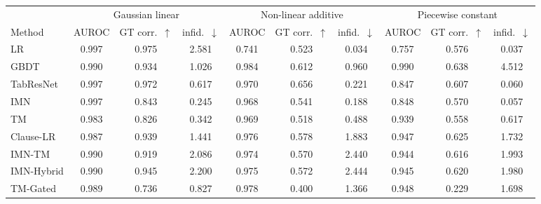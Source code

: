 \begin{tabular}{lccccccccc}
\toprule
 & \multicolumn{3}{c}{Gaussian linear} & \multicolumn{3}{c}{Non-linear additive} & \multicolumn{3}{c}{Piecewise constant} \\
\cmidrule(lr){2-4}\cmidrule(lr){5-7}\cmidrule(lr){8-10}
Method & AUROC & GT corr.\ $\uparrow$ & infid.\ $\downarrow$ & AUROC & GT corr.\ $\uparrow$ & infid.\ $\downarrow$ & AUROC & GT corr.\ $\uparrow$ & infid.\ $\downarrow$ \\
\midrule
LR & 0.997 & 0.975 & 2.581 & 0.741 & 0.523 & 0.034 & 0.757 & 0.576 & 0.037 \\
GBDT & 0.990 & 0.934 & 1.026 & 0.984 & 0.612 & 0.960 & 0.990 & 0.638 & 4.512 \\
TabResNet & 0.997 & 0.972 & 0.617 & 0.970 & 0.656 & 0.221 & 0.847 & 0.607 & 0.060 \\
IMN & 0.997 & 0.843 & 0.245 & 0.968 & 0.541 & 0.188 & 0.848 & 0.570 & 0.057 \\
TM & 0.983 & 0.826 & 0.342 & 0.969 & 0.518 & 0.488 & 0.939 & 0.558 & 0.617 \\
Clause-LR & 0.987 & 0.939 & 1.441 & 0.976 & 0.578 & 1.883 & 0.947 & 0.625 & 1.732 \\
IMN-TM & 0.990 & 0.919 & 2.086 & 0.974 & 0.570 & 2.440 & 0.944 & 0.616 & 1.993 \\
IMN-Hybrid & 0.990 & 0.945 & 2.200 & 0.975 & 0.572 & 2.444 & 0.945 & 0.620 & 1.980 \\
TM-Gated & 0.989 & 0.736 & 0.827 & 0.978 & 0.400 & 1.366 & 0.948 & 0.229 & 1.698 \\
\bottomrule
\end{tabular}
